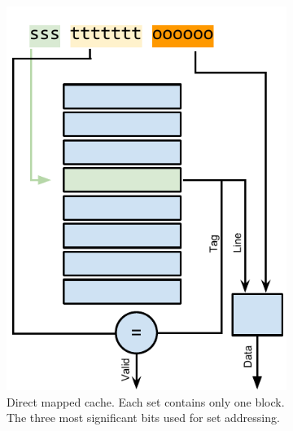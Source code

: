 \begin{figure}
    \centering
    \begin{subfigure}[b]{0.48\textwidth}
        \includegraphics[width=\textwidth]{figures/introduction/dircache_read}
        \caption{Direct mapped cache. Each set contains only one block. The three most significant bits used for set addressing.}
        \label{fig:introduction:cache:dir}
    \end{subfigure}\hfill%
    \begin{subfigure}[b]{0.48\textwidth}

\end{subfigure}
\end{figure}
